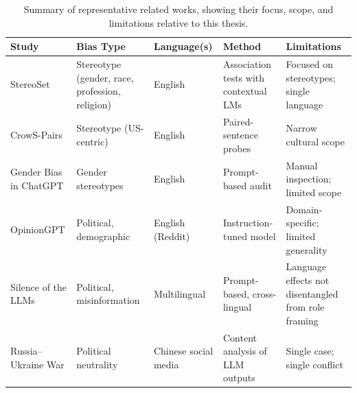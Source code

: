 \begin{table}[H]
\centering
\small
\renewcommand{\arraystretch}{1.2}
\begin{tabularx}{\textwidth}{lYYYY}
\toprule
\textbf{Study} & \textbf{Bias Type} & \textbf{Language(s)} & \textbf{Method} & \textbf{Limitations} \\
\midrule
StereoSet \parencite{stereoset2021} & Stereotype (gender, race, profession, religion) & English & Association tests with contextual LMs & Focused on stereotypes; single language \\
CrowS\mbox{-}Pairs \parencite{crows2020pairs} & Stereotype (US\mbox{-}centric) & English & Paired\mbox{-}sentence probes & Narrow cultural scope \\
Gender Bias in ChatGPT \parencite{gender_gpt2023} & Gender stereotypes & English & Prompt\mbox{-}based audit & Manual inspection; limited scope \\
OpinionGPT \parencite{opiniongpt2023} & Political, demographic & English (Reddit) & Instruction-tuned model & Domain\mbox{-}specific; limited generality \\
Silence of the LLMs \parencite{silence_llms2023} & Political, misinformation & Multilingual & Prompt\mbox{-}based, cross\mbox{-}lingual & Language effects not disentangled from role framing \\
Russia--Ukraine War \parencite{russia_china_war2024} & Political neutrality & Chinese social media & Content analysis of LLM outputs & Single case; single conflict \\
\bottomrule
\end{tabularx}
\caption{Summary of representative related works, showing their focus, scope, and limitations relative to this thesis.}
\label{tab:relatedworks}
\end{table}

